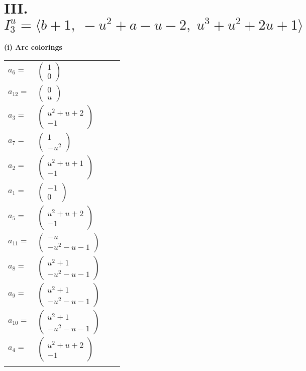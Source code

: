 \documentclass[1p]{elsarticle_modified}
\theoremstyle{definition}
\begin{document}
\centering \section*{III. $I^u_{3}= \langle b+1,\;- u^2+a- u-2,\;u^3+u^2+2 u+1 \rangle$}
\flushleft \textbf{(i) Arc colorings}\\
\begin{tabular}{m{7pt} m{180pt} m{7pt} m{180pt} }
\flushright $a_{6}=$&$\begin{pmatrix}1\\0\end{pmatrix}$ \\
\flushright $a_{12}=$&$\begin{pmatrix}0\\u\end{pmatrix}$ \\
\flushright $a_{3}=$&$\begin{pmatrix}u^2+u+2\\-1\end{pmatrix}$ \\
\flushright $a_{7}=$&$\begin{pmatrix}1\\- u^2\end{pmatrix}$ \\
\flushright $a_{2}=$&$\begin{pmatrix}u^2+u+1\\-1\end{pmatrix}$ \\
\flushright $a_{1}=$&$\begin{pmatrix}-1\\0\end{pmatrix}$ \\
\flushright $a_{5}=$&$\begin{pmatrix}u^2+u+2\\-1\end{pmatrix}$ \\
\flushright $a_{11}=$&$\begin{pmatrix}- u\\- u^2- u-1\end{pmatrix}$ \\
\flushright $a_{8}=$&$\begin{pmatrix}u^2+1\\- u^2- u-1\end{pmatrix}$ \\
\flushright $a_{9}=$&$\begin{pmatrix}u^2+1\\- u^2- u-1\end{pmatrix}$ \\
\flushright $a_{10}=$&$\begin{pmatrix}u^2+1\\- u^2- u-1\end{pmatrix}$ \\
\flushright $a_{4}=$&$\begin{pmatrix}u^2+u+2\\-1\end{pmatrix}$\\&\end{tabular}
\end{document}
